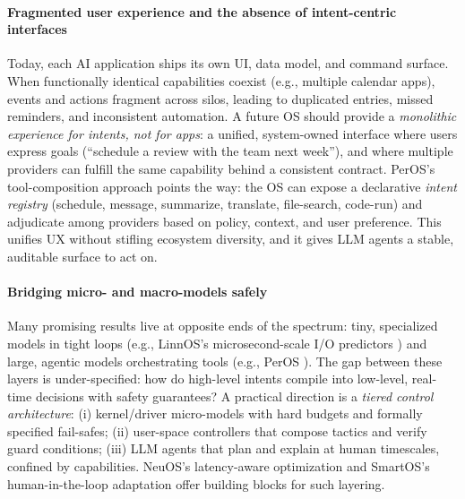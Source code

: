 \documentclass{article}
\begin{document}
\paragraph{Fragmented user experience and the absence of intent-centric interfaces}
Today, each AI application ships its own UI, data model, and command surface. When functionally identical capabilities coexist (e.g., multiple calendar apps), events and actions fragment across silos, leading to duplicated entries, missed reminders, and inconsistent automation. A future OS should provide a \emph{monolithic experience for intents, not for apps}: a unified, system-owned interface where users express goals (``schedule a review with the team next week''), and where multiple providers can fulfill the same capability behind a consistent contract. PerOS’s tool-composition approach \cite{he2024peros} points the way: the OS can expose a declarative \emph{intent registry} (schedule, message, summarize, translate, file-search, code-run) and adjudicate among providers based on policy, context, and user preference. This unifies UX without stifling ecosystem diversity, and it gives LLM agents a stable, auditable surface to act on.

\paragraph{Bridging micro- and macro-models safely}
Many promising results live at opposite ends of the spectrum: tiny, specialized models in tight loops (e.g., LinnOS’s microsecond-scale I/O predictors \cite{hao2020linnos}) and large, agentic models orchestrating tools (e.g., PerOS \cite{he2024peros}). The gap between these layers is under-specified: how do high-level intents compile into low-level, real-time decisions with safety guarantees? A practical direction is a \emph{tiered control architecture}: (i) kernel/driver micro-models with hard budgets and formally specified fail-safes; (ii) user-space controllers that compose tactics and verify guard conditions; (iii) LLM agents that plan and explain at human timescales, confined by capabilities. NeuOS’s latency-aware optimization \cite{bateni2020neuos} and SmartOS’s human-in-the-loop adaptation \cite{goodarzy2021smartos} offer building blocks for such layering.
\end{document}
